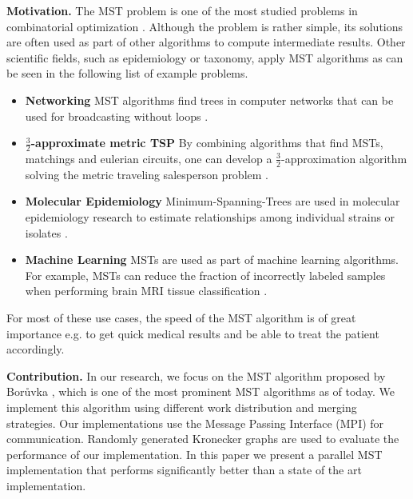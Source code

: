 \documentclass[letterpaper]{article}
\newcommand{\mypar}[1]{{\bf #1.}}
\begin{document}
\mypar{Motivation}
%
%
The MST problem is one of the most studied problems in combinatorial optimization \cite{graham1985history}. Although the
problem is rather simple, its solutions are often used as part of other algorithms to compute intermediate results.
Other scientific fields, such as epidemiology or taxonomy, apply MST algorithms as can be seen in the following list of
example problems.
\begin{itemize}[noitemsep]
  \item \textbf{Networking} MST algorithms find trees in computer networks that can be used for broadcasting without
    loops \cite{reverse_path_broadcast}.
  \item \textbf{$\frac{3}{2}$-ap\-prox\-i\-mate metric TSP} By combining algorithms that find MSTs, matchings and
    eulerian circuits, one can develop a $\frac{3}{2}$-ap\-prox\-i\-mation algorithm solving the metric traveling
    salesperson problem \cite{christofides1976worst}.
  \item \textbf{Molecular Epidemiology} Minimum-Spanning-Trees are used in molecular epidemiology research to estimate
    relationships among individual strains or isolates \cite{spada2004use, salipante2011inadequacies}.
  \item \textbf{Machine Learning} MSTs are used as part of machine learning algorithms. For example, MSTs can reduce the
    fraction of incorrectly labeled samples when performing brain MRI tissue classification \cite{cocosco2003fully}.
\end{itemize}
For most of these use cases, the speed of the MST algorithm is of great importance e.g. to get quick medical results and
be able to treat the patient accordingly.

\mypar{Contribution}
In our research, we focus on the MST algorithm proposed by Bor\r{u}vka \cite{boruuvka1926jistem, nevsetvril2001otakar},
which is one of the most prominent MST algorithms as of today. We implement this algorithm using different work
distribution and merging strategies. Our implementations use the Message Passing Interface (MPI) for communication.
Randomly generated Kronecker graphs are used to evaluate the performance of our implementation. In this paper we present
a parallel MST implementation that performs significantly better than a state of the art implementation.
\end{document}
